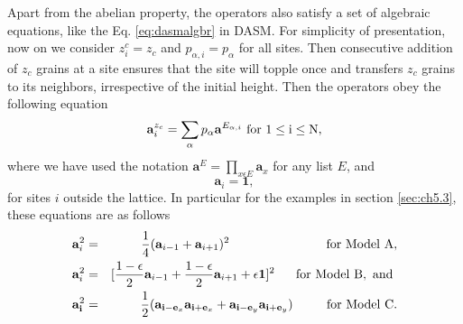 \documentclass[11pt,a4paper]{book}
\begin{document}
Apart from the abelian property, the operators also satisfy a set 
of algebraic equations, like the Eq. \eqref{eq:dasmalgbr} in DASM. For simplicity of presentation, now on we
consider $z_i^c=z_c$ and $p_{\alpha,i}=p_{\alpha}$ for all sites. Then
consecutive addition of $z_c$ grains at a site 
ensures that the site will topple once and transfers $z_c$ grains to
its neighbors, irrespective of the initial height. Then
the operators obey the following equation
\begin{equation}
  \mathbf{a}_i^{z_c} =
\sum_{\alpha}p_{\alpha}\mathbf{a}^{E_{\alpha, i}} \rm {~for~
}1\le i\le N, 
\end{equation}
where we have used the notation $\mathbf{a}^{E}=\displaystyle
\prod_{x\epsilon E}\mathbf{a}_{x}$ for any list $E$, and
\begin{equation}
  \mathbf{a}_i = \mathbf{1},
  \label{a_0}
\end{equation}
for sites $i$ outside the lattice. In particular for the examples
in section \ref{sec:ch5.3}, these equations are as follows
\begin{eqnarray}
\mathbf{a}_i^2&=&\frac{1}{4}(\mathbf{a}_{i-1}+\mathbf{a}_{i+1})^2
\rm{~~~~~~~~~~~~~~~~~~~~~~~for~Model~A,} \label{modA} \\
\mathbf{a}_i^2&=&[\frac{1-\epsilon}{2}\mathbf{a}_{i-1}+\frac{1-\epsilon}{2}\mathbf{a}_{i+1}+\epsilon
\mathbf{1}]^2 \rm{~~~~~for~Model~B,~and~} \\
\mathbf{a}_\mathbf{i}^2&=&\frac{1}{2}(\mathbf{a}_{\mathbf{i}-\mathbf{e}_x}\mathbf{a}_{\mathbf{i}+\mathbf{e}_x}+\mathbf{a}_{\mathbf{i}-\mathbf{e}_y}\mathbf{a}_{\mathbf{i}+\mathbf{e}_y})\rm{~~~~~~~~for~Model~C.}
\end{eqnarray}
\end{document}
